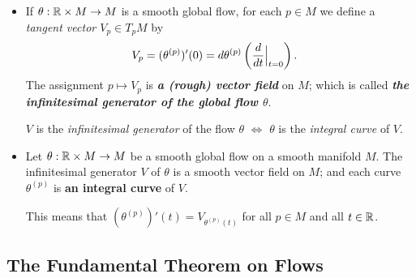 \documentclass[11pt]{article}
\begin{document}
\begin{itemize}
\item \begin{definition}
If $\theta: {\mathbb R} \times M \rightarrow M$ is a smooth global flow, for each $p \in M$ we define a \emph{tangent vector $V_p \in T_pM$} by
\begin{align*}
V_p &=  (\theta^{(p)})'(0) = d\theta^{(p)}\left(\frac{d}{dt}\Bigr|_{t=0}\right).
\end{align*} 
The assignment $p \mapsto V_p$ is \emph{\textbf{a (rough) vector field}} on $M$; which is called \emph{\textbf{the infinitesimal generator of the global flow $\theta$}}.
\end{definition}

\begin{remark}
$V$ is the \emph{infinitesimal generator} of the flow $\theta$ $\Leftrightarrow$ $\theta$ is the \emph{integral curve} of $V$.
\end{remark}

\item \begin{proposition}
Let $\theta: {\mathbb R} \times M \rightarrow M$ be a smooth global flow on a smooth manifold $M$. The infinitesimal generator $V$ of $\theta$ is a smooth vector field on $M$; and each curve $\theta^{(p)}$ is \textbf{an integral curve} of $V$.
\end{proposition} This means that $(\theta^{(p)})'(t) = V_{\theta^{(p)}(t)}$ for all $p \in M$ and all $t \in {\mathbb R}$.
\end{itemize}


\subsection{The Fundamental Theorem on Flows}
\end{document}
